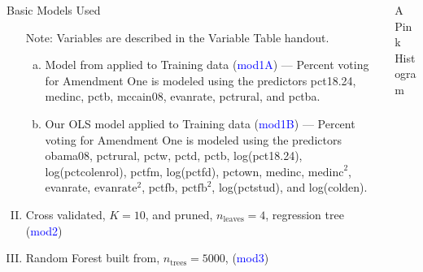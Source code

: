\documentclass[final]{beamer}\usepackage[]{graphicx}\usepackage[]{color}
\newenvironment{knitrout}{}{} %
\begin{document}
\begin{frame}[fragile]
\begin{columns}[t]
\begin{column}{0.23\linewidth}
\begin{minipage}[t][.955\textheight]{\linewidth}
\begin{block}{Basic Models Used}
\begin{enumerate}[I.]
Note: Variables are described in the Variable Table handout.
\begin{enumerate}[a.]
\item Model from \cite{DE12} applied to Training data (\textcolor{blue}{mod1A}) --- Percent voting for Amendment One is modeled using the predictors pct18.24, medinc, pctb, mccain08, evanrate, pctrural, and pctba. 
\item Our OLS model applied to Training data (\textcolor{blue}{mod1B}) --- Percent voting for Amendment One is modeled using the predictors obama08, pctrural, pctw, pctd, pctb, log(pct18.24), log(pctcolenrol), pctfm, log(pctfd), pctown,  medinc, $\text{medinc}^2$, evanrate, $\text{evanrate}^2$, pctfb, $\text{pctfb}^2$, log(pctstud), and log(colden).
\end{enumerate}
\item Cross validated, $K = 10$, and pruned, $n_{\text{leaves}}=4$, regression tree \cite{JF09} (\textcolor{blue}{mod2})
\item Random Forest built from, $n_{\text{trees}} = 5000 $, \cite{AL02} (\textcolor{blue}{mod3})
\end{enumerate}
\vspace{0ex}

\end{block}
\vfill

\end{minipage}
\end{column}%


\begin{column}{0.23\linewidth}
\begin{minipage}[t][.955\textheight]{\linewidth} 

\vspace{0ex}
\begin{block}{A Pink Histogram}
\vspace{0ex}
\begin{knitrout}
\color{fgcolor}


\end{knitrout}
\end{block}
\end{minipage}
\end{column}
\end{columns}
\end{frame}
\end{document}
